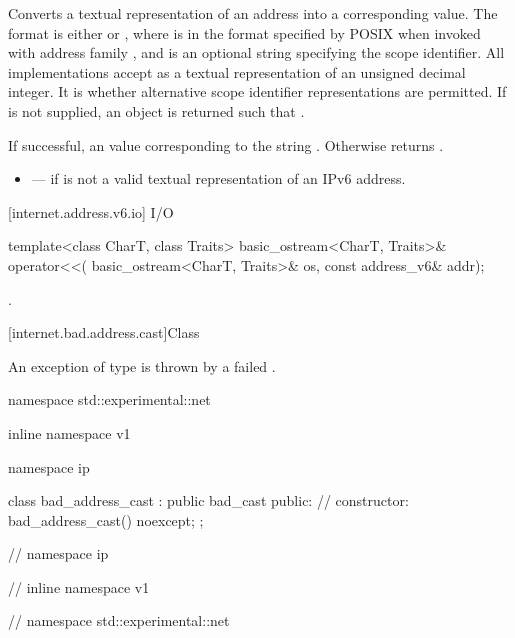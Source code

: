 \begin{itemdescr}
\pnum
\effects Converts a textual representation of an address into a corresponding  value. The format is either  or \tcode{\%}, where  is in the format specified by POSIX  when invoked with address family , and  is an optional string specifying the scope identifier. All implementations accept as  a textual representation of an unsigned decimal integer. It is  whether alternative scope identifier representations are permitted. If  is not supplied, an  object is returned such that .

\pnum
\returns If successful, an  value corresponding to the string . Otherwise returns .

\pnum
\errors
\begin{itemize}
\item
{} --- if  is not a valid textual representation of an IPv6 address.
\end{itemize}
\end{itemdescr}



[internet.address.v6.io]{ I/O}

%
\begin{itemdecl}
template<class CharT, class Traits>
  basic_ostream<CharT, Traits>& operator<<(
    basic_ostream<CharT, Traits>& os, const address_v6& addr);
\end{itemdecl}

\begin{itemdescr}
\pnum
\returns {}.
\end{itemdescr}




%
[internet.bad.address.cast]{Class }

\pnum
An exception of type  is thrown by a failed .

\begin{codeblock}
namespace std::experimental::net {
inline namespace v1 {
namespace ip {

  class bad_address_cast : public bad_cast
  {
  public:
    // constructor:
    bad_address_cast() noexcept;
  };

} // namespace ip
} // inline namespace v1
} // namespace std::experimental::net
\end{codeblock}

